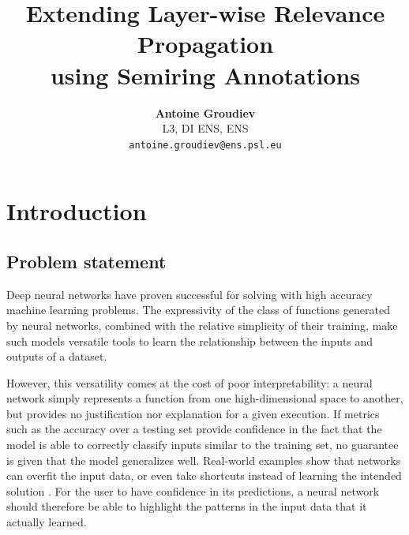 \documentclass[twocolumn]{../cs-classes/cs-classes}
\title{Extending Layer-wise Relevance Propagation\\ using Semiring Annotations}
\author{
    \textbf{Antoine Groudiev}\\L3, DI ENS, ENS\\\nolinkurl{antoine.groudiev@ens.psl.eu}
}
\date{}
\newcommand*{\1}{\digitsbb{1}}
\newcommand*{\0}{\digitsbb{0}}
\begin{document}

\section{Introduction}
\subsection{Problem statement}
Deep neural networks have proven successful for solving with high accuracy machine learning problems. The expressivity of the class of functions generated by neural networks, combined with the relative simplicity of their training, make such models versatile tools to learn the relationship between the inputs and outputs of a dataset.

However, this versatility comes at the cost of poor interpretability: a neural network simply represents a function from one high-dimensional space to another, but provides no justification nor explanation for a given execution. If metrics such as the accuracy over a testing set provide confidence in the fact that the model is able to correctly classify inputs similar to the training set, no guarantee is given that the model generalizes well. Real-world examples show that networks can overfit the input data, or even take shortcuts instead of learning the intended solution \cite{shortcuts}. For the user to have confidence in its predictions, a neural network should therefore be able to highlight the patterns in the input data that it actually learned.
\end{document}
